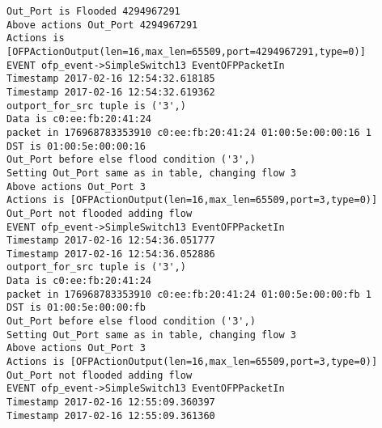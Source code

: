 \begin{lstlisting}[frame=single, caption={The RYU Verbose log}, label={lst:RYUverboselog}]
Out_Port is Flooded 4294967291
Above actions Out_Port 4294967291
Actions is [OFPActionOutput(len=16,max_len=65509,port=4294967291,type=0)]
EVENT ofp_event->SimpleSwitch13 EventOFPPacketIn
Timestamp 2017-02-16 12:54:32.618185
Timestamp 2017-02-16 12:54:32.619362
outport_for_src tuple is ('3',)
Data is c0:ee:fb:20:41:24
packet in 176968783353910 c0:ee:fb:20:41:24 01:00:5e:00:00:16 1
DST is 01:00:5e:00:00:16
Out_Port before else flood condition ('3',)
Setting Out_Port same as in table, changing flow 3
Above actions Out_Port 3
Actions is [OFPActionOutput(len=16,max_len=65509,port=3,type=0)]
Out_Port not flooded adding flow 
EVENT ofp_event->SimpleSwitch13 EventOFPPacketIn
Timestamp 2017-02-16 12:54:36.051777
Timestamp 2017-02-16 12:54:36.052886
outport_for_src tuple is ('3',)
Data is c0:ee:fb:20:41:24
packet in 176968783353910 c0:ee:fb:20:41:24 01:00:5e:00:00:fb 1
DST is 01:00:5e:00:00:fb
Out_Port before else flood condition ('3',)
Setting Out_Port same as in table, changing flow 3
Above actions Out_Port 3
Actions is [OFPActionOutput(len=16,max_len=65509,port=3,type=0)]
Out_Port not flooded adding flow 
EVENT ofp_event->SimpleSwitch13 EventOFPPacketIn
Timestamp 2017-02-16 12:55:09.360397
Timestamp 2017-02-16 12:55:09.361360
\end{lstlisting}

